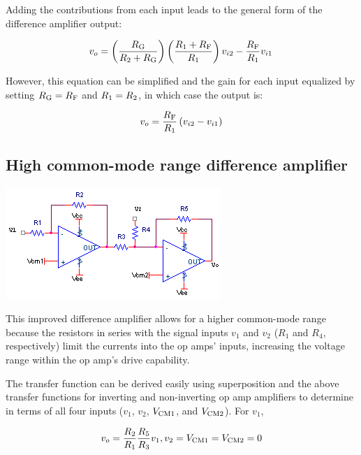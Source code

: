 Adding the contributions from each input leads to the general form of the difference amplifier output:

\begin{equation}
	\vout = \left(\frac{\R[G]}{\R[2] + \R[G]}\right)\left(\frac{\R[1] + \R[F]}{\R[1]}\right)\vin[2] - \frac{\R[F]}{\R[1]}\vin[1]
	\label{eq:difference_amp_general}
\end{equation}

However, this equation can be simplified and the gain for each input equalized by setting \(\R[G] = \R[F]\) and \(\R[1] = \R[2]\), in which case the output is:

\begin{equation}
	\vout = \frac{\R[F]}{\R[1]}\left(\vin[2] - \vin[1]\right)
	\label{eq:difference_amp}
\end{equation}

\subsection{High common-mode range difference amplifier}
\begin{center}
	\includegraphics{schematics/highcmdifferenceamplifier.PNG}
\end{center}
This improved difference amplifier allows for a higher common-mode range because the resistors in series with the signal inputs $v_1$ and $v_2$ ($R_1$ and $R_4$, respectively) limit the currents into the op amps' inputs, increasing the voltage range within the op amp's drive capability. \autocite[418]{op-amps-for-everyone}

The transfer function can be derived easily using superposition and the above transfer functions for inverting and non-inverting op amp amplifiers to determine \vout in terms of all four inputs ($v_1$, $v_2$, $V_\mathrm{CM1}$, and $V_\mathrm{CM2}$).
For $v_1$,

\begin{equation}
\vout = \frac{R_2}{R_1}\frac{R_5}{R_3}v_1, v_2 = V\sub{CM1} = V\sub{CM2} = 0
\end{equation}

